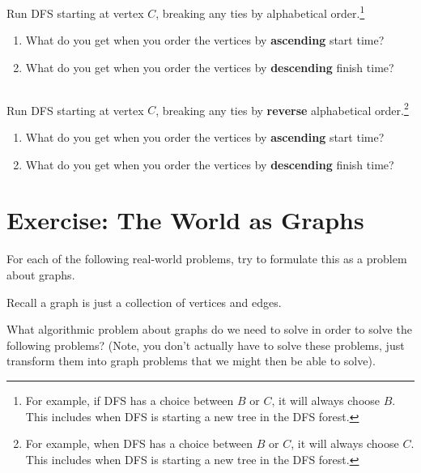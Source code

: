 \documentclass [12pt]{article}
\begin{document}
Run DFS starting at vertex $C$, breaking any ties by alphabetical order.\footnote {For example, if DFS has a choice between $B$ or $C$, it will always choose $B$. This includes when DFS is starting a new tree in the DFS forest.}

\begin{enumerate}[label=(\alph *)]
    \item {} What do you get when you order the vertices by \textbf {ascending} start time?
    \item {} What do you get when you order the vertices by \textbf {descending} finish time?
\end{enumerate} 

\subsection {}

Run DFS starting at vertex $C$, breaking any ties by \textbf {reverse} alphabetical order.\footnote {For example, when DFS has a choice between $B$ or $C$, it will always choose $C$. This includes when DFS is starting a new tree in the DFS forest.}

\begin{enumerate}[label=(\alph *)]
    \item {} What do you get when you order the vertices by \textbf {ascending} start time?
    \item {} What do you get when you order the vertices by \textbf {descending} finish time?
\end{enumerate} 



\pagebreak
\section{Exercise: The World as Graphs }
For each of the following real-world problems, try to formulate this as a problem about graphs.

Recall a graph is just a collection of vertices and edges.

What algorithmic problem about graphs do we need to solve in order to solve the following
problems? (Note, you don't actually have to solve these problems, just transform them into
graph problems that we might then be able to solve).
\end{document}
